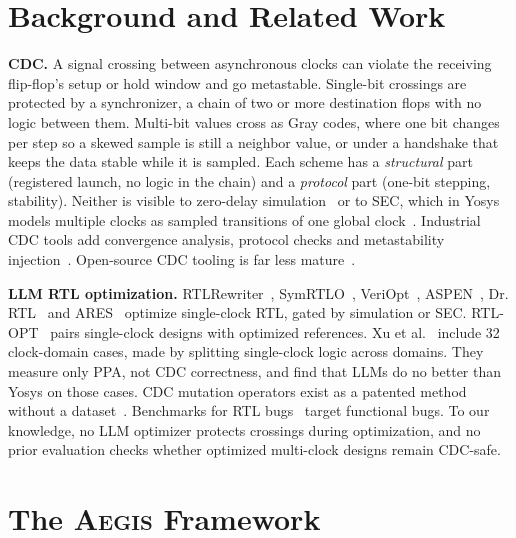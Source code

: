 \documentclass[conference,10pt]{IEEEtran}
\newcommand{\aegis}{\textsc{Aegis}}
\begin{document}
\section{Background and Related Work}

\textbf{CDC.} A signal crossing between asynchronous clocks can violate the receiving flip-flop's setup or hold
window and go metastable. Single-bit crossings are protected by a synchronizer, a chain of two or more destination
flops with no logic between them. Multi-bit values cross as Gray codes, where one bit changes per step so a skewed
sample is still a neighbor value, or under a handshake that keeps the data stable while it is sampled. Each scheme
has a \emph{structural} part (registered launch, no logic in the chain) and a \emph{protocol} part (one-bit
stepping, stability). Neither is visible to zero-delay simulation~\cite{mvcdc2024} or to SEC, which in Yosys models
multiple clocks as sampled transitions of one global clock~\cite{eqy}. Industrial CDC tools add convergence
analysis, protocol checks and metastability injection~\cite{li2009cdc,mvcdc2024}. Open-source CDC tooling is far
less mature~\cite{vygescdc,opencdc}.

\textbf{LLM RTL optimization.} RTLRewriter~\cite{rtlrewriter2024}, SymRTLO~\cite{symrtlo2025},
VeriOpt~\cite{veriopt2025}, ASPEN~\cite{aspen2025}, Dr.\,RTL~\cite{drrtl2026} and ARES~\cite{ares2027} optimize
single-clock RTL, gated by simulation or SEC. RTL-OPT~\cite{rtlopt2026} pairs single-clock designs with optimized
references. Xu et al.~\cite{xu2025} include 32 clock-domain cases, made by splitting single-clock logic across
domains. They measure only PPA, not CDC correctness, and find that LLMs do no better than Yosys on those cases. CDC
mutation operators exist as a patented method without a dataset~\cite{gupta2018cdcmutation}. Benchmarks for RTL
bugs~\cite{mantra2023,veribugbench2026,gatetruth2026} target functional bugs. To our knowledge, no LLM optimizer
protects crossings during optimization, and no prior evaluation checks whether optimized multi-clock designs remain
CDC-safe.

\section{The \aegis{} Framework}
\label{sec:method}
\end{document}
